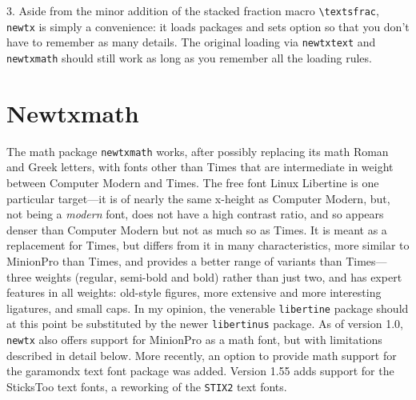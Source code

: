\documentclass[\fsc]{article}
\theoremstyle{oldplain}
\theoremstyle{plain}
\begin{document}
3. Aside from the minor addition of the stacked fraction macro \verb|\textsfrac|, {\tt newtx} is simply a convenience: it loads packages and sets option so that you don't have to remember as many details.
The original loading via {\tt newtxtext} and {\tt newtxmath} should still work as long as you remember all the loading rules.

\section{Newtxmath}
The math package {\tt newtxmath} works, after possibly replacing its math Roman and Greek letters, with fonts other than Times that are intermediate in weight between Computer Modern and Times. The free font Linux Libertine is one particular target---it is of nearly the same x-height as Computer Modern, but, not being a \emph{modern} font, does not have a high contrast ratio, and so appears  denser than Computer Modern but not as much so as Times. It is meant as a replacement for Times, but  differs from it in many characteristics, more similar to MinionPro than Times, and provides a better range of variants than Times---three weights (regular, semi-bold and bold) rather than just two, and has expert features in all weights: old-style figures, more extensive and more interesting ligatures,  and  small caps. In my opinion, the venerable {\tt libertine} package should at this point be substituted by the newer {\tt libertinus} package. As of version 1.0, {\tt newtx} also offers support for MinionPro as a math font, but with limitations described in detail below. More recently, an option to provide math support for the \textsf{garamondx} text font package was added. Version 1.55 adds support for the {SticksToo} text fonts, a reworking of the {\tt STIX2} text fonts.
\end{document}
